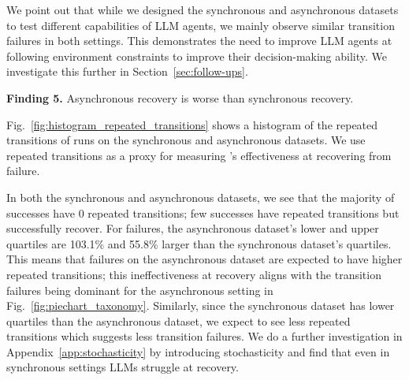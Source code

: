 We point out that while we designed the synchronous and asynchronous datasets to test different capabilities of LLM agents, we mainly observe similar transition failures in both settings. This demonstrates the need to improve LLM agents at following environment constraints to improve their decision-making ability. We investigate this further in Section~\ref{sec:follow-ups}.

\textbf{Finding 5.} Asynchronous recovery is worse than synchronous recovery.

Fig.~\ref{fig:histogram_repeated_transitions} shows a histogram of the repeated transitions of \gptfo{} \react{} runs on the synchronous and asynchronous datasets. We use repeated transitions as a proxy for measuring \react{}'s effectiveness at recovering from failure.


In both the synchronous and asynchronous datasets, we see that the majority of successes have 0 repeated transitions; few successes have repeated transitions but successfully recover. For failures, the asynchronous dataset's lower and upper quartiles are 103.1\% and 55.8\% larger than the synchronous dataset's quartiles. This means that failures on the asynchronous dataset are expected to have higher repeated transitions; this ineffectiveness at recovery aligns with the transition failures being dominant for the asynchronous setting in Fig.~\ref{fig:piechart_taxonomy}. Similarly, since the synchronous dataset has lower quartiles than the asynchronous dataset, we expect to see less repeated transitions which suggests less transition failures. We do a further investigation in Appendix~\ref{app:stochasticity} by introducing stochasticity and find that even in synchronous settings LLMs struggle at recovery.


